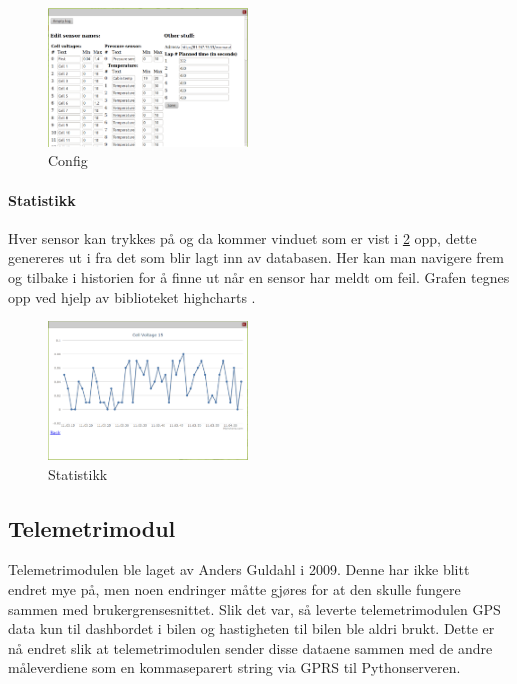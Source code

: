 \begin{figure}[H]
\includegraphics[width=200px]{images/config.png}
\caption{Config}
\label{fig:config}
\end{figure}

\paragraph{Statistikk}
Hver sensor kan trykkes på og da kommer vinduet som er vist i \ref{fig:stats} opp, dette genereres ut i fra det som blir lagt inn av databasen. Her kan man navigere frem og tilbake i historien for å finne ut når en sensor har meldt om feil. Grafen tegnes opp ved hjelp av biblioteket highcharts \cite{highcharts}.

\begin{figure}[H]
\includegraphics[width=200px]{images/stat.png}
\caption{Statistikk}
\label{fig:stats}
\end{figure}

\subsection{Telemetrimodul}
Telemetrimodulen ble laget av Anders Guldahl \cite{telemetrithesis} i 2009. Denne har ikke blitt endret mye på, men noen endringer måtte gjøres for at den skulle fungere sammen med brukergrensesnittet.
Slik det var, så leverte telemetrimodulen GPS data kun til dashbordet i bilen og hastigheten til bilen ble aldri brukt. Dette er nå endret slik at telemetrimodulen sender disse dataene sammen med de andre måleverdiene som en kommaseparert string via GPRS til Pythonserveren.
